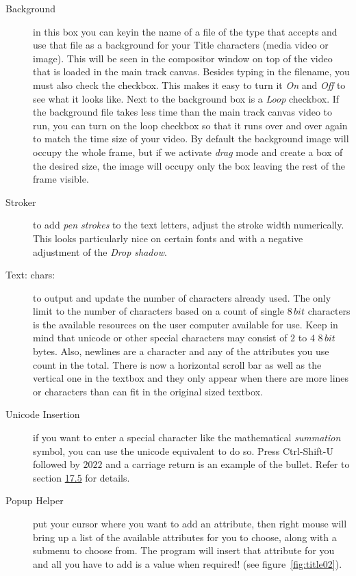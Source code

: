 \begin{description}
    \item[Background] in this box you can keyin the name of a file of the type that \CGG{} accepts and use that file as a background for your Title characters (media video or image). This will be seen in the compositor window on top of the video that is loaded in the main track canvas. Besides typing in the filename, you must also check the checkbox. This makes it easy to turn it \textit{On} and \textit{Off} to see what it looks like. Next to the background box is a \textit{Loop} checkbox. If the background file takes less time than the main track canvas video to run, you can turn on the loop checkbox so that it runs over and over again to match the time size of your video. By default the background image will occupy the whole frame, but if we activate \textit{drag} mode and create a box of the desired size, the image will occupy only the box leaving the rest of the frame visible.
    \item[Stroker] to add \textit{pen strokes} to the text letters, adjust the stroke width numerically. This looks particularly nice on certain fonts and with a negative adjustment of the \textit{Drop shadow}.
    \item[Text: chars:] to output and update the number of characters already used. The only limit to the number of characters based on a count of single $8\, bit$ characters is the available resources on the user computer available for \CGG{} use. Keep in mind that unicode or other special characters may consist of $2$ to $4$ $8\,bit$ bytes. Also, newlines are a character and any of the attributes you use count in the total. There is now a horizontal scroll bar as well as the vertical one in the textbox and they only appear when there are more lines or characters than can fit in the original sized textbox.
    \item[Unicode Insertion] if you want to enter a special character like the mathematical \textit{summation} symbol, you can use the unicode equivalent to do so. Press Ctrl-Shift-U followed by $2022$ and a carriage return is an example of the bullet. Refer to section \hyperref[sec:textbox_non_std_character_unicode]{17.5} for details.
    \item[Popup Helper] put your cursor where you want to add an attribute, then right mouse will bring up a list of the available attributes for you to choose, along with a submenu to choose from. The program will insert that attribute for you and all you have to add is a value when required! (see figure~\ref{fig:title02}).
\end{description}

